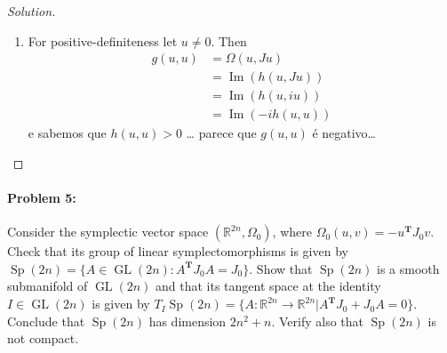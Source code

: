 \begin{proof}[Solution]
\begin{enumerate}
		\item For positive-definiteness let $u\neq 0$. Then
			\begin{align*}
				g(u,u)&=\Omega(u,Ju)\\
				&=\operatorname{Im}(h(u,Ju))\\
				&=\operatorname{Im}(h(u,iu))\\
				&=\operatorname{Im}(-ih(u,u))
			\end{align*}
			e sabemos que $h(u,u)>0$ … {\color{magenta}parece que $g(u,u)$  \'e negativo…}
	\end{enumerate}

\end{proof}

 \paragraph{Problem 5:} Consider the symplectic vector space $(\mathbb{R}^{2n},\Omega_0)$, where $\Omega_0(u,v)=-u^{\mathbf{T}} J_0v$. Check that its group of linear symplectomorphisms is given by $\operatorname{Sp}(2n)=\{A\in \operatorname{GL}(2n):A^{\mathbf{T}}J_0A=J_0\}.$ Show that $\operatorname{Sp}(2n)$ is a smooth submanifold of $\operatorname{GL}(2n)$ and that its tangent space at the identity $I\in \operatorname{GL}(2n)$ is given by $T_{I}\operatorname{Sp}(2n)=\{A:\mathbb{R}^{2n}\to \mathbb{R}^{2n}|A^{\mathbf{T}} J_0+J_0A=0\} $. Conclude that $\operatorname{Sp}(2n)$ has dimension $2n^{2} +n$. Verify also that $\operatorname{Sp}(2n)$ is not compact.

